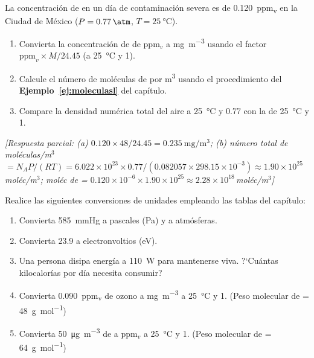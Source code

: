 \begin{bloque_ejercicios}
\begin{ejercicios}
\item La concentraci\'on de  en un d\'ia de contaminaci\'on
severa es de \SI{0.120}{ppm_v} en la Ciudad de M\'exico
($P = \SI{0.77}{\atm}$, $T = \SI{25}{\celsius}$).

\begin{enumerate}[label=\alph*)]
    \item Convierta la concentraci\'on de  de ppm$_v$ a
          \si{\milli\gram\per\cubic\metre} usando el factor
          $\text{ppm}_v \times M/24.45$ (a \SI{25}{\celsius}
          y \SI{1}{\atm}).
    \item Calcule el n\'umero de mol\'eculas de 
          por \si{\cubic\metre} usando el procedimiento del
          \textbf{Ejemplo~\ref{ej:moleculasl}} del cap\'itulo.
    \item Compare la densidad num\'erica total del aire
          a \SI{25}{\celsius} y \SI{0.77}{\atm} con la de
          \SI{25}{\celsius} y \SI{1}{\atm}.
\end{enumerate}

\textit{[Respuesta parcial:
(a) $0.120\times48/24.45 = \SI{0.235}{\milli\gram\per\cubic\metre}$;
(b) n\'umero total de mol\'eculas/m$^3$
    $= N_A P/(RT) = 6.022\times10^{23}\times0.77
    /(0.082057\times298.15\times10^{-3})
    \approx 1.90\times10^{25}$\,mol\'ec/m$^3$;
    mol\'ec de  = $0.120\times10^{-6}
    \times1.90\times10^{25}
    \approx 2.28\times10^{18}$\,mol\'ec/m$^3$]}

\item Realice las siguientes conversiones de unidades empleando
las tablas del cap\'itulo:

\begin{enumerate}[label=\alph*)]
    \item Convierta \SI{585}{\mmHg} a pascales (Pa) y a atm\'osferas.
    \item Convierta \SI{23.9}{\calory} a electronvoltios (eV).
    \item Una persona disipa energ\'ia a \SI{110}{\watt} para
          mantenerse viva. ?`Cu\'antas kilocalor\'ias por d\'ia
          necesita consumir?
    \item Convierta \SI{0.090}{ppm_v} de ozono a
          \si{\milli\gram\per\cubic\metre} a \SI{25}{\celsius}
          y \SI{1}{\atm}.
          (Peso molecular de  = \SI{48}{\gram\per\mole})
    \item Convierta \SI{50}{\micro\gram\per\cubic\metre} de
           a ppm$_v$ a \SI{25}{\celsius} y \SI{1}{\atm}.
          (Peso molecular de  = \SI{64}{\gram\per\mole})
\end{enumerate}


\end{ejercicios}
\end{bloque_ejercicios}
